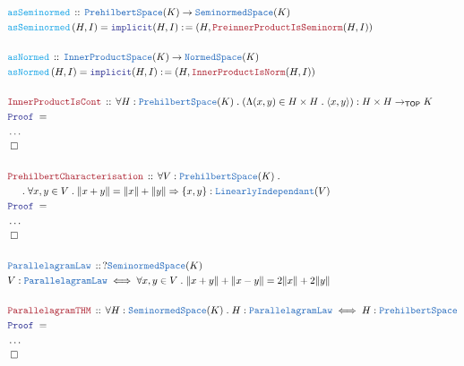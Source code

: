 \documentclass[12pt]{scrartcl}
\newcommand{\TYPE}[1]{\textcolor{NavyBlue}{\mathtt{#1}}}
\newcommand{\FUNC}[1]{\textcolor{Cerulean}{\mathtt{#1}}}
\newcommand{\LOGIC}[1]{\textcolor{Blue}{\mathtt{#1}}}
\newcommand{\THM}[1]{\textcolor{Maroon}{\mathtt{#1}}}
\renewcommand{\.}{\; . \;}
\newcommand{\de}{: \kern 0.1pc =}
\newcommand{\Act}[1]{\left( #1 \right)}
\newcommand{\Theorem}[2]{& \THM{#1} \, :: \, #2 \\ & \Proof = \\ }
\newcommand{\DeclareType}[2]{& \TYPE{#1} \, :: \, #2 \\}
\newcommand{\DefineType}[3]{& #1 : \TYPE{#2} \iff #3 \\}
\newcommand{\DeclareFunc}[2]{& \FUNC{#1} \, :: \, #2 \\}
\newcommand{\DefineNamedFunc}[4]{&  \FUNC{#1}\Act{#2} = #3 \de #4 \\}
\newcommand{\NewLine}{\\ & \kern 1pc}
\newcommand{\Page}[1]{\begin{align*} #1 \end{align*} \newpage   }
\newcommand{\NoProof}{ & \ldots \\ \EndProof}
\newcommand{\QED}{\; \square}
\newcommand{\EndProof}{& \QED \\}
\newcommand{\Proof}{\LOGIC{Proof} \; }
\newcommand{\NS}{\TYPE{NormedSpace}}
\newcommand{\SNS}{\TYPE{SeminormedSpace}}
\begin{document}
\Page{
 \DeclareFunc{ asSeminormed }{ \TYPE{PrehilbertSpace}(K) \to \SNS(K) }
  \DefineNamedFunc{ asSeminormed }{ H,I }{ \LOGIC{implicit}(H,I) }{  (H, \THM{PreinnerProductIsSeminorm}(H,I) )  }
  \\
 \DeclareFunc{ asNormed }{ \TYPE{InnerProductSpace}(K) \to \NS(K) }
  \DefineNamedFunc{ asNormed }{ H,I }{ \LOGIC{implicit}(H,I) }{  (H, \THM{InnerProductIsNorm}(H,I) )  }
  \\
\Theorem{InnerProductIsCont}{\forall H : \TYPE{PrehilbertSpace}(K) \.
(\Lambda (x,y) \in H \times H \. \langle x,y \rangle ) : H \times H \to_{\mathsf{TOP}} K 
}
\NoProof
\\
\Theorem{PrehilbertCharacterisation}{ \forall V : \TYPE{PrehilbertSpace}(K) 
\. \NewLine
\. \forall x, y \in V \.  \| x + y \| = \| x \| + \| y \| \Rightarrow 
\{ x, y \} : \TYPE{LinearlyIndependant}(V)
}
\NoProof
\\
\DeclareType{ParallelagramLaw}{ ? \SNS(K)}
\DefineType{ V }{ ParallelagramLaw }{ \forall x, y \in V \. \| x + y \| + \| x - y \| = 2\|x\| + 2\|y \|}
\\
\Theorem{ParallelagramTHM}{ \forall H : \SNS(K) \. H : \TYPE{ParallelagramLaw} \iff 
H : \TYPE{PrehilbertSpace}}
\NoProof
}
\end{document}
